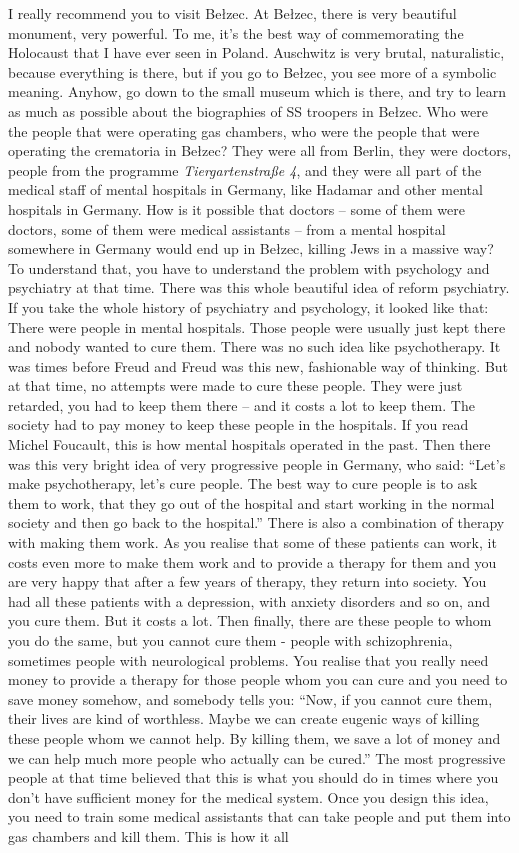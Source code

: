 I really recommend you to visit Bełzec. At Bełzec, there is very beautiful monument, very powerful. To me, it’s the best way of commemorating the Holocaust that I have ever seen in Poland. Auschwitz is very brutal, naturalistic, because everything is there, but if you go to Bełzec, you see more of a symbolic meaning. Anyhow, go down to the small museum which is there, and try to learn as much as possible about the biographies of SS troopers in Bełzec. Who were the people that were operating gas chambers, who were the people that were operating the crematoria in Bełzec? They were all from Berlin, they were doctors, people from the programme \textit{Tiergartenstraße 4}, and they were all part of the medical staff of mental hospitals in Germany, like Hadamar and other mental hospitals in Germany. How is it possible that doctors – some of them were doctors, some of them were medical assistants – from a mental hospital somewhere in Germany would end up in Bełzec, killing Jews in a massive way? To understand that, you have to understand the problem with psychology and psychiatry at that time. There was this whole beautiful idea of reform psychiatry. If you take the whole history of psychiatry and psychology, it looked like that: There were people in mental hospitals. Those people were usually just kept there and nobody wanted to cure them. There was no such idea like psychotherapy. It was times before Freud and Freud was this new, fashionable way of thinking. But at that time, no attempts were made to cure these people. They were just retarded, you had to keep them there – and it costs a lot to keep them. The society had to pay money to keep these people in the hospitals. If you read Michel Foucault, this is how mental hospitals operated in the past. Then there was this very bright idea of very progressive people in Germany, who said: ``Let’s make psychotherapy, let’s cure people. The best way to cure people is to ask them to work, that they go out of the hospital and start working in the normal society and then go back to the hospital.'' There is also a combination of therapy with making them work. As you realise that some of these patients can work, it costs even more to make them work and to provide a therapy for them and you are very happy that after a few years of therapy, they return into society. You had all these patients with a depression, with anxiety disorders and so on, and you cure them. But it costs a lot. Then finally, there are these people to whom you do the same, but you cannot cure them - people with schizophrenia, sometimes people with neurological problems. You realise that you really need money to provide a therapy for those people whom you can cure and you need to save money somehow, and somebody tells you: ``Now, if you cannot cure them, their lives are kind of worthless. Maybe we can create eugenic ways of killing these people whom we cannot help. By killing them, we save a lot of money and we can help much more people who actually can be cured.'' The most progressive people at that time believed that this is what you should do in times where you don’t have sufficient money for the medical system. Once you design this idea, you need to train some medical assistants that can take people and put them into gas chambers and kill them. This is how it all 